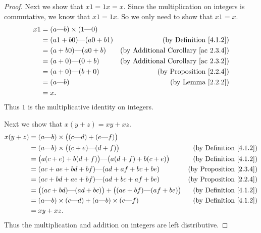 \begin{proof}
    Next we show that \(x1 = 1x = x\).
    Since the multiplication on integers is commutative, we know that \(x1 = 1x\).
    So we only need to show that \(x1 = x\).
    \begin{align*}
        x1 & = (a \text{---} b) \times (1 \text{---} 0)                                                   \\
           & = (a1 + b0) \text{---} (a0 + b1)           & \text{(by Definition \ref{4.1.2})}              \\
           & = (a + b0) \text{---} (a0 + b)             & \text{(by Additional Corollary \ref{ac 2.3.4})} \\
           & = (a + 0) \text{---} (0 + b)               & \text{(by Additional Corollary \ref{ac 2.3.2})} \\
           & = (a + 0) \text{---} (b + 0)               & \text{(by Proposition \ref{2.2.4})}             \\
           & = (a \text{---} b)                         & \text{(by Lemma \ref{2.2.2})}                   \\
           & = x.
    \end{align*}
    Thus \(1\) is the multiplicative identity on integers.

    Next we show that \(x(y + z) = xy + xz\).
    \begin{align*}
        x(y + z) & = (a \text{---} b) \times \big((c \text{---} d) + (e \text{---} f)\big)                                                     \\
                 & = (a \text{---} b) \times \big((c + e) \text{---} (d + f)\big)                        & \text{(by Definition \ref{4.1.2})}  \\
                 & = \big(a(c + e) + b(d + f)\big) \text{---} \big(a(d + f) + b(c + e)\big)              & \text{(by Definition \ref{4.1.2})}  \\
                 & = (ac + ae + bd + bf) \text{---} (ad + af + bc + be)                                  & \text{(by Proposition \ref{2.3.4})} \\
                 & = (ac + bd + ae + bf) \text{---} (ad + bc + af + be)                                  & \text{(by Proposition \ref{2.2.4})} \\
                 & = \big((ac + bd) \text{---} (ad + bc)\big) + \big((ae + bf) \text{---} (af + be)\big) & \text{(by Definition \ref{4.1.2})}  \\
                 & = (a \text{---} b) \times (c \text{---} d) + (a \text{---} b) \times (e \text{---} f) & \text{(by Definition \ref{4.1.2})}  \\
                 & = xy + xz.
    \end{align*}
    Thus the multiplication and addition on integers are left distributive.


\end{proof}
